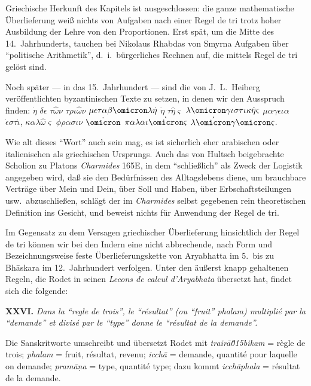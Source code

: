 \documentclass[11pt,a4paper]{article}
\newcommand{\enquote}[1]{``#1''}
\begin{document}
Griechische Herkunft des Kapitels ist ausgeschlossen: die ganze mathematische \"Uberlieferung wei\ss{} nichts von Aufgaben nach einer Regel de tri trotz hoher Ausbildung der Lehre von den Proportionen. Erst sp\"at, um die Mitte des 14.\ Jahrhunderts, tauchen bei Nikolaus Rhabdas von Smyrna Aufgaben \"uber \enquote{politische Arithmetik}, d.\ i.\ b\"urgerliches Rechnen auf, die mittels Regel de tri gel\"ost sind.

Noch sp\"ater --- in das 15.\ Jahrhundert --- sind die von J.\ L.\ Heiberg ver\"offentlichten byzantinischen Texte zu setzen, in denen wir den Ausspruch finden: $\dot{\eta}$ $\delta\epsilon$ $\tau\hat{\omega}\nu$ $\tau\rho\iota\hat{\omega}\nu$ $\mu\epsilon\tau\alpha\beta\omicron\lambda\dot{\eta}$ $\dot{\eta}$ $\tau\hat{\eta}\varsigma$ $\lambda\omicron\gamma\iota\sigma\tau\iota\kappa\hat{\eta}\varsigma$ $\mu\alpha\gamma\epsilon\iota\alpha$ $\dot{\epsilon}\sigma\tau\acute{\iota}$, $\kappa\alpha\lambda\hat{\omega}\varsigma$ $\phi\rho\alpha\sigma\iota\nu$ $\dot{\omicron}$ $\pi\alpha\lambda\alpha\iota\grave{\omicron}\varsigma$ $\lambda\acute{\omicron}\gamma\omicron\varsigma$.

Wie alt dieses \enquote{Wort} auch sein mag, es ist sicherlich eher arabischen oder italienischen als griechischen Ursprungs. Auch das von Hultsch beigebrachte Scholion zu Platons \textit{Charmides} 165E, in dem \enquote{schlie\ss{}lich} als Zweck der Logistik angegeben wird, da\ss{} sie den Bed\"urfnissen des Alltagslebens diene, um brauchbare Vertr\"age \"uber Mein und Dein, \"uber Soll und Haben, \"uber Erbschaftsteilungen usw.\ abzuschlie\ss{}en, schl\"agt der im \textit{Charmides} selbst gegebenen rein theoretischen Definition ins Gesicht, und beweist nichts f\"ur Anwendung der Regel de tri.

Im Gegensatz zu dem Versagen griechischer \"Uberlieferung hinsichtlich der Regel de tri k\"onnen wir bei den Indern eine nicht abbrechende, nach Form und Bezeichnungsweise feste \"Uberlieferungskette von Aryabhatta im 5.\ bis zu Bh\=askara im 12.\ Jahrhundert verfolgen. Unter den \"au\ss{}erst knapp gehaltenen Regeln, die Rodet in seinen \textit{Lecons de calcul d'Aryabhata} \"ubersetzt hat, findet sich die folgende:

\textbf{XXVI.} \textit{Dans la \enquote{regle de trois}, le \enquote{r\'esultat} (ou \enquote{fruit} \textit{phalam}) multipli\'e par la \enquote{demande} et divis\'e par le \enquote{type} donne le \enquote{r\'esultat de la demande}.}

Die Sanskritworte umschreibt und \"ubersetzt Rodet mit \textit{trair\=a\u015bikam} = r\`egle de trois; \textit{phalam} = fruit, r\'esultat, revenu; \textit{icch\=a} = demande, quantit\'e pour laquelle on demande; \textit{pram\=a\d{n}a} = type, quantit\'e type; dazu kommt \textit{icch\=aphala} = r\'esultat de la demande.
\end{document}
